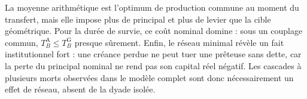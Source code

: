 \documentclass[11pt,a4paper]{article}
\newcommand{\1}{\mathbf 1}
\theoremstyle{definition}
\theoremstyle{remark}
\begin{document}
La moyenne arithmétique est l'optimum de production commune au moment du
transfert, mais elle impose plus de principal et plus de levier que la
cible géométrique. Pour la durée de survie, ce coût nominal domine : sous
un couplage commun, $T_B^{\mathrm A}\leq T_B^{\mathrm G}$ presque
sûrement. Enfin, le réseau minimal révèle un fait institutionnel fort :
une créance perdue ne peut
tuer une prêteuse sans dette, car la perte du principal nominal ne rend pas
son capital réel négatif. Les cascades à plusieurs morts observées dans le
modèle complet sont donc nécessairement un effet de réseau, absent de la
dyade isolée.
\end{document}
